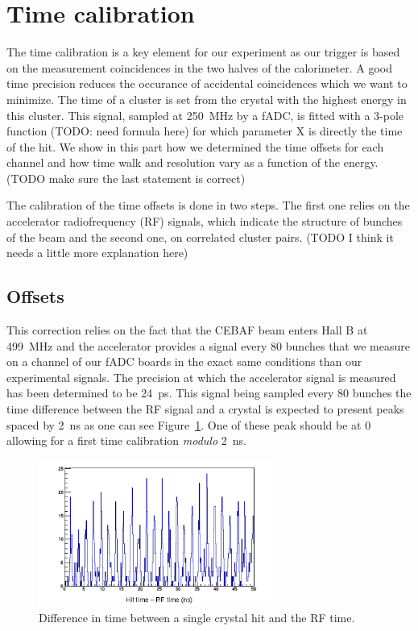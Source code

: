 \documentclass[review]{elsarticle}
\begin{document}
\section{Time calibration}

The time calibration is a key element for our experiment as our trigger is 
based on the measurement coincidences in the two halves of the calorimeter. 
A good time precision reduces the occurance of accidental coincidences which 
we want to minimize. The time of a cluster is set from the crystal with the 
highest energy in this cluster. This signal, sampled at 250~MHz by a fADC, is 
fitted with a 3-pole function (TODO: need formula here) for which parameter
X is directly the time of the hit. We show in this part how we determined the 
time offsets for each channel and how time walk and resolution vary as a 
function of the energy. (TODO make sure the last statement is correct)

The calibration of the time offsets is done in two steps. The first one relies 
on the accelerator radiofrequency (RF) signals, which indicate the structure of
bunches of the beam and the second one, on correlated cluster pairs.
(TODO I think it needs a little more explanation here)

\subsection{Offsets}

This correction relies on the fact that the CEBAF beam enters Hall B at 
499~MHz and the accelerator provides a signal every 80 bunches that we
measure on a channel of our fADC boards in the exact same conditions than
our experimental signals. The precision at which the accelerator signal is 
measured has been determined to be 24~ps. This signal being sampled every 80 
bunches the time difference between the RF signal and a crystal is expected 
to present peaks spaced by 2~ns as one can see Figure~\ref{RF}. One of these 
peak should be at 0 allowing for a first time calibration {\it modulo} 2~ns.

\begin{figure}[ht!]
\centering
\includegraphics[width=0.70\textwidth]{crystalSpectra.png}
\caption{Difference in time between a single crystal hit and the RF time.}
\label{RF}
\end{figure}
\end{document}
